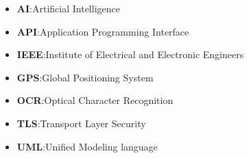\begin{itemize}
	\item \textbf{AI}:\@ Artificial Intelligence
	\item \textbf{API}:\@ Application Programming Interface
	\item \textbf{IEEE}:\@ Institute of Electrical and Electronic Engineers
	\item \textbf{GPS}:\@ Global Positioning System
	\item \textbf{OCR}:\@ Optical Character Recognition
	\item \textbf{TLS}:\@ Transport Layer Security
	\item \textbf{UML}:\@ Unified Modeling language
\end{itemize}